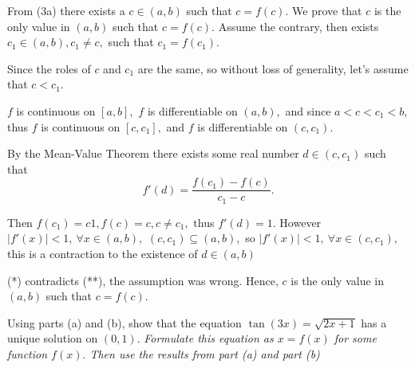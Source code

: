 \documentclass{article}
\begin{document}
\begin{soln}
    From (3a) there exists a $c \in (a,b)$ such that $c = f(c).$
    We prove that $c$ is the only value in $(a,b)$ such that $c = f(c).$
    Assume the contrary, then exists $c_1 \in (a,b), c_1 \ne c,$ such that $c_1 = f(c_1).$ 
    
    Since the roles of $c$ and $c_1$ are the same, so without loss of generality, let's assume that $c < c_1.$

    $f$ is continuous on $[a,b],$ $f$ is differentiable on $(a,b),$ and since $a < c < c_1 < b,$
    thus $f$ is continuous on $[c,c_1],$ and $f$ is differentiable on $(c,c_1).$
    
    By the Mean-Value Theorem there exists some real number $d \in (c,c_1)$ such that 
    \[
        f'(d) = \frac{f(c_1) - f(c)}{c_1 - c}.
    \]

    Then $f(c_1) = c1, f(c) = c, c\ne c_1,$ thus $f'(d) = 1.$
    However $|f'(x)| < 1,\ \forall x \in (a,b),$ $(c,c_1) \subseteq (a,b),$ so $|f'(x)| < 1,\ \forall x \in (c, c_1),$
    this is a contraction to the existence of $d \in (a,b)$
    
    (*) contradicts (**), the assumption was wrong.
    Hence, $c$ is the only value in $(a,b)$ such that $c = f(c).$
\end{soln}

\newpage

\begin{problem*}[3c]
    Using parts (a) and (b), show that the equation $\tan(3x) = \sqrt{2x + 1}$ has a unique solution on $(0, 1).$
    \textit{Formulate this equation as $x = f(x)$ for some function $f(x).$ Then use the results from part (a) and part (b)}
\end{problem*}
\end{document}
